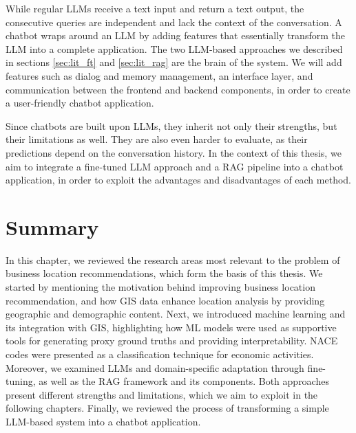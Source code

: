 While regular LLMs receive a text input and return a text output, the consecutive queries are independent and lack the context of the conversation. A chatbot wraps around an LLM by adding features that essentially transform the LLM into a complete application. The two LLM-based approaches we described in sections \ref{sec:lit_ft} and \ref{sec:lit_rag} are the brain of the system. We will add features such as dialog and memory management, an interface layer, and communication between the frontend and backend components, in order to create a user-friendly chatbot application.

Since chatbots are built upon LLMs, they inherit not only their strengths, but their limitations as well. They are also even harder to evaluate, as their predictions depend on the conversation history.
In the context of this thesis, we aim to integrate a fine-tuned LLM approach and a RAG pipeline into a chatbot application, in order to exploit the advantages and disadvantages of each method.


\section{Summary}

In this chapter, we reviewed the research areas most relevant to the problem of business location recommendations, which form the basis of this thesis. We started by mentioning the motivation behind improving business location recommendation, and how GIS data enhance location analysis by providing geographic and demographic content. Next, we introduced machine learning and its integration with GIS, highlighting how ML models were used as supportive tools for generating proxy ground truths and providing interpretability. NACE codes were presented as a classification technique for economic activities. Moreover, we examined LLMs and domain-specific adaptation through fine-tuning, as well as the RAG framework and its components. Both approaches present different strengths and limitations, which we aim to exploit in the following chapters. Finally, we reviewed the process of transforming a simple LLM-based system into a chatbot application.
